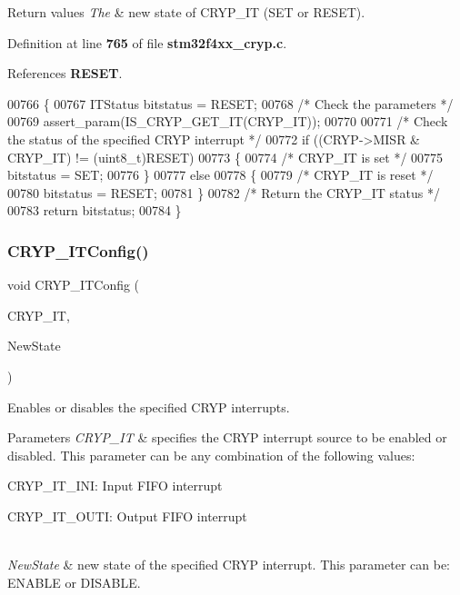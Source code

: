 \begin{DoxyRetVals}{Return values}
{\em The} & new state of C\+R\+Y\+P\+\_\+\+IT (S\+ET or R\+E\+S\+ET). \\
\hline
\end{DoxyRetVals}


Definition at line \textbf{ 765} of file \textbf{ stm32f4xx\+\_\+cryp.\+c}.



References \textbf{ R\+E\+S\+ET}.


\begin{DoxyCode}
00766 \{
00767   ITStatus bitstatus = RESET;
00768   \textcolor{comment}{/* Check the parameters */}
00769   assert_param(IS_CRYP_GET_IT(CRYP\_IT));
00770 
00771   \textcolor{comment}{/* Check the status of the specified CRYP interrupt */}
00772   \textcolor{keywordflow}{if} ((CRYP->MISR &  CRYP\_IT) != (uint8\_t)RESET)
00773   \{
00774     \textcolor{comment}{/* CRYP\_IT is set */}
00775     bitstatus = SET;
00776   \}
00777   \textcolor{keywordflow}{else}
00778   \{
00779     \textcolor{comment}{/* CRYP\_IT is reset */}
00780     bitstatus = RESET;
00781   \}
00782   \textcolor{comment}{/* Return the CRYP\_IT status */}
00783   \textcolor{keywordflow}{return} bitstatus;
00784 \}
\end{DoxyCode}
\mbox{\label{group__CRYP__Group5_gafbf5ee5f2c3ae4404149a994e15b33d8}} 
\subsubsection{C\+R\+Y\+P\+\_\+\+I\+T\+Config()}
{\footnotesize\ttfamily void C\+R\+Y\+P\+\_\+\+I\+T\+Config (\begin{DoxyParamCaption}\item[{uint8\+\_\+t}]{C\+R\+Y\+P\+\_\+\+IT,  }\item[{\textbf{ Functional\+State}}]{New\+State }\end{DoxyParamCaption})}



Enables or disables the specified C\+R\+YP interrupts. 


\begin{DoxyParams}{Parameters}
{\em C\+R\+Y\+P\+\_\+\+IT} & specifies the C\+R\+YP interrupt source to be enabled or disabled. This parameter can be any combination of the following values\+: \begin{DoxyItemize}
\item C\+R\+Y\+P\+\_\+\+I\+T\+\_\+\+I\+NI\+: Input F\+I\+FO interrupt \item C\+R\+Y\+P\+\_\+\+I\+T\+\_\+\+O\+U\+TI\+: Output F\+I\+FO interrupt \end{DoxyItemize}
\\
\hline
{\em New\+State} & new state of the specified C\+R\+YP interrupt. This parameter can be\+: E\+N\+A\+B\+LE or D\+I\+S\+A\+B\+LE. \\
\hline
\end{DoxyParams}

